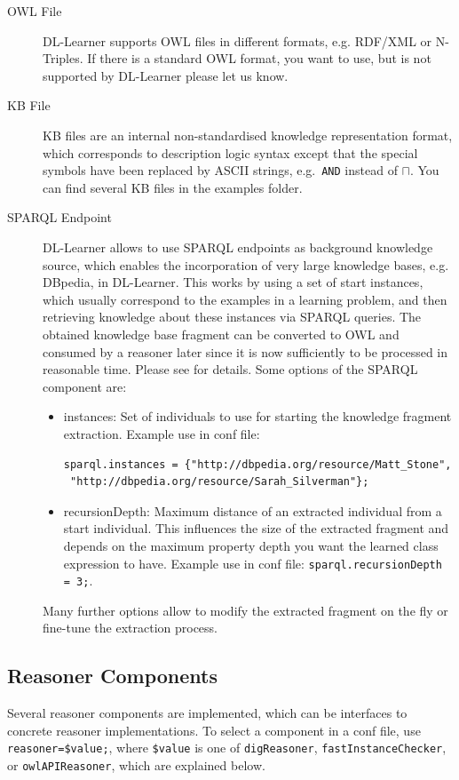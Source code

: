 \documentclass[a4paper,12pt]{scrartcl}
\begin{document}
\begin{description}
 \item[OWL File] DL-Learner supports OWL files in different formats, e.g. RDF/XML or N-Triples. If there is a standard OWL format, you want to use, but is not supported by DL-Learner please let us know.
 \item[KB File] KB files are an internal non-standardised knowledge representation format, which corresponds to description logic syntax except that the special symbols have been replaced by ASCII strings, e.g.~\verb|AND| instead of $\sqcap$. You can find several KB files in the examples folder.
 \item[SPARQL Endpoint] DL-Learner allows to use SPARQL endpoints as background knowledge source, which enables the incorporation of very large knowledge bases, e.g. DBpedia\cite{2008_dbpedia}, in DL-Learner. This works by using a set of start instances, which usually correspond to the examples in a learning problem, and then retrieving knowledge about these instances via SPARQL queries. The obtained knowledge base fragment can be converted to OWL and consumed by a reasoner later since it is now sufficiently to be processed in reasonable time. Please see \cite{2009_ijswis} for details. Some options of the SPARQL component are:
\begin{itemize}
 \item instances: Set of individuals to use for starting the knowledge fragment extraction. Example use in conf file: \begin{verbatim}sparql.instances = {"http://dbpedia.org/resource/Matt_Stone",
 "http://dbpedia.org/resource/Sarah_Silverman"};\end{verbatim}
 \item recursionDepth: Maximum distance of an extracted individual from a start individual. This influences the size of the extracted fragment and depends on the maximum property depth you want the learned class expression to have. Example use in conf file: \verb|sparql.recursionDepth = 3;|.
\end{itemize}
 Many further options allow to modify the extracted fragment on the fly or fine-tune the extraction process.
\end{description}

\subsection{Reasoner Components}

Several reasoner components are implemented, which can be interfaces to concrete reasoner implementations. To select a component in a conf file, use \verb|reasoner=$value;|, where  \verb|$value| is one of \verb|digReasoner|, \verb|fastInstanceChecker|, or \verb|owlAPIReasoner|, which are explained below.
\end{document}
